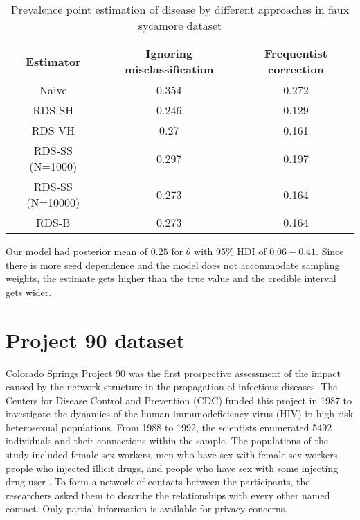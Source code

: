 \begin{table}[htbp]
    \centering
    \caption{\label{tab:results-estimators-faux-sycamore-data}Prevalence point estimation of
    disease by different approaches in faux sycamore dataset}
    \begin{tabular}{ccc}
        \hline
        Estimator & Ignoring misclassification & Frequentist correction \\ \hline
        Naive & 0.354 & 0.272 \\
        RDS-SH & 0.246 & 0.129 \\
        RDS-VH & 0.27 & 0.161 \\
        RDS-SS (N=1000) & 0.297 & 0.197 \\
        RDS-SS (N=10000) & 0.273 & 0.164 \\
        RDS-B & 0.273 & 0.164 \\ \hline
        \end{tabular}
\end{table}

Our model had posterior mean of $0.25$ for $\theta$ with 95\% HDI of $0.06 -
0.41$. Since there is more seed dependence and the model does not accommodate
sampling weights, the estimate gets higher than the true value and the
credible interval gets wider.

\section{Project 90 dataset}

Colorado Springs Project 90 was the first prospective assessment of the impact
caused by the network structure in the propagation of infectious diseases. The
Centers for Disease Control and Prevention (CDC) funded this project in 1987
to investigate the dynamics of the human immunodeficiency virus (HIV) in
high-risk heterosexual populations. From 1988 to 1992, the scientists
enumerated 5492 individuals and their connections within the sample. The
populations of the study included female sex workers, men who have sex with
female sex workers, people who injected illicit drugs, and people who have sex
with some injecting drug user \cite[p. 1332]{woodhouse1994mapping}. To form a network of contacts between the
participants, the researchers asked them to describe the relationships with
every other named contact. Only partial information is available for privacy
concerns. 


